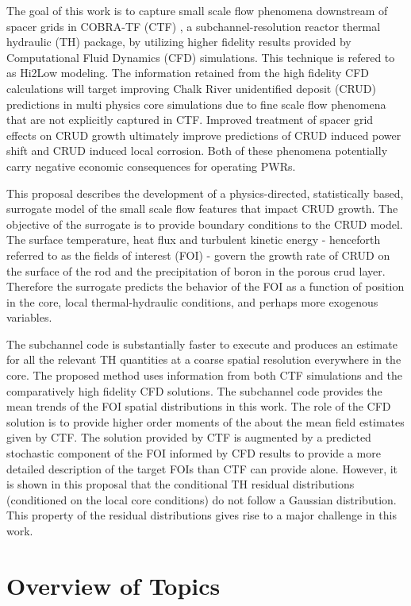 The goal of this work is to capture small scale flow phenomena downstream of
spacer grids in COBRA-TF (CTF) \cite{salko12}, a subchannel-resolution reactor
thermal hydraulic (TH) package, by utilizing higher fidelity results provided
by Computational Fluid Dynamics (CFD) simulations.  This technique is refered to as Hi2Low modeling.  
The information retained from the high
fidelity CFD calculations will target improving Chalk River unidentified deposit (CRUD) predictions in
multi physics core simulations due to fine scale flow phenomena that are not
explicitly captured in CTF.  
Improved treatment of spacer grid
effects on CRUD growth ultimately improve predictions of CRUD induced power shift
and CRUD induced local corrosion.  Both of these phenomena potentially carry negative economic consequences for operating PWRs.

This proposal describes the development of a physics-directed, statistically
based, surrogate model of the small scale flow features that impact CRUD
growth.   
The objective of the surrogate is to provide boundary conditions to the CRUD
model.  The surface temperature, heat flux and
turbulent kinetic energy - henceforth referred to as the fields of interest (FOI) - govern the growth rate of CRUD on the surface
of the rod and the precipitation of boron in the porous crud layer.
Therefore the surrogate predicts the behavior of the FOI as a function
of position in the core, local thermal-hydraulic conditions, and perhaps 
more exogenous variables. 

The subchannel code is substantially faster to execute and produces an estimate for
all the relevant TH quantities at a coarse spatial resolution everywhere in the core.  The proposed method uses information from both CTF simulations and the comparatively high fidelity CFD solutions.
The subchannel code provides the mean trends of the 
FOI spatial distributions in this work.  The role of the CFD solution is to provide
higher order moments of the about the mean field estimates given by CTF.  
The solution provided by CTF is augmented by a
predicted stochastic component of the FOI informed by CFD results to provide a more detailed description of
the target FOIs than CTF can provide alone.  However, it is shown in this proposal that the conditional TH residual distributions (conditioned on the local core conditions) do not follow a Gaussian distribution.  This property of
the residual distributions gives rise to a major challenge in this work.


\section{Overview of Topics}

